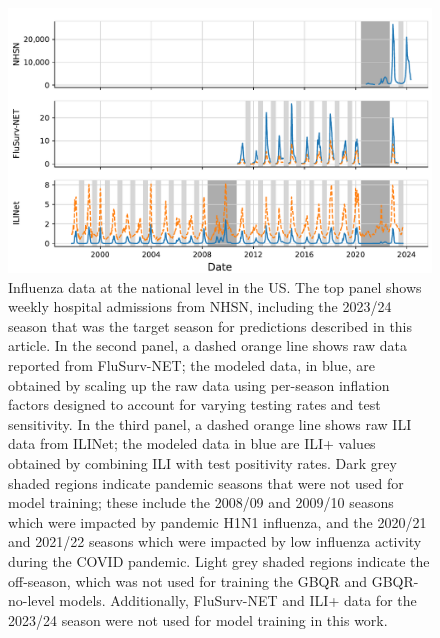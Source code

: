 \documentclass{article}\usepackage[]{graphicx}\usepackage[]{xcolor}
\begin{document}
\begin{figure}[!ht]
    \centering
    \includegraphics[width=\textwidth]{../artifacts/figures/data_overview.pdf}
    \caption{Influenza data at the national level in the US. The top panel shows weekly hospital admissions from NHSN, including the 2023/24 season that was the target season for predictions described in this article. In the second panel, a dashed orange line shows raw data reported from FluSurv-NET; the modeled data, in blue, are obtained by scaling up the raw data using per-season inflation factors designed to account for varying testing rates and test sensitivity.  In the third panel, a dashed orange line shows raw ILI data from ILINet; the modeled data in blue are ILI+ values obtained by combining ILI with test positivity rates. Dark grey shaded regions indicate pandemic seasons that were not used for model training; these include the 2008/09 and 2009/10 seasons which were impacted by pandemic H1N1 influenza, and the 2020/21 and 2021/22 seasons which were impacted by low influenza activity during the COVID pandemic. Light grey shaded regions indicate the off-season, which was not used for training the GBQR and GBQR-no-level models.  Additionally, FluSurv-NET and ILI+ data for the 2023/24 season were not used for model training in this work.}
    \label{fig:data_overview}
\end{figure}
\end{document}
